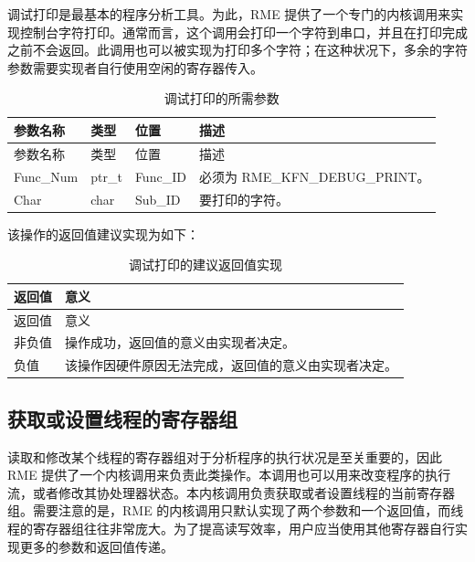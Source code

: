 调试打印是最基本的程序分析工具。为此，RME 提供了一个专门的内核调用来实现控制台字符打印。通常而言，这个调用会打印一个字符到串口，并且在打印完成之前不会返回。此调用也可以被实现为打印多个字符；在这种状况下，多余的字符参数需要实现者自行使用空闲的寄存器传入。

\begin{xltabular}{\textwidth}{@{}>{\hsize\raggedright\arraybackslash}X>{\hsize\raggedright\arraybackslash}X>{\hsize\raggedright\arraybackslash}X>{\hsize\raggedright\arraybackslash}X@{}}
\caption{调试打印的所需参数}\label{tab:8-109-debug-print-parameters}\\
\toprule
参数名称 & 类型 & 位置 & 描述\tabularnewline
\endfirsthead
\toprule
参数名称 & 类型 & 位置 & 描述\tabularnewline
\midrule
\endhead
\bottomrule
\endlastfoot
Func\_Num & ptr\_t & Func\_ID & 必须为 RME\_KFN\_DEBUG\_PRINT。\tabularnewline
Char & char & Sub\_ID & 要打印的字符。\tabularnewline
\end{xltabular}

该操作的返回值建议实现为如下：

\begin{xltabular}{\textwidth}{@{}>{\hsize\raggedright\arraybackslash}X>{\hsize\raggedright\arraybackslash}X@{}}
\caption{调试打印的建议返回值实现}\label{tab:8-110-debug-print-suggested-return-values}\\
\toprule
返回值 & 意义\tabularnewline
\endfirsthead
\toprule
返回值 & 意义\tabularnewline
\midrule
\endhead
\bottomrule
\endlastfoot
    非负值 & 操作成功，返回值的意义由实现者决定。\tabularnewline
    负值 & 该操作因硬件原因无法完成，返回值的意义由实现者决定。\tabularnewline
\end{xltabular}

\subsection{获取或设置线程的寄存器组}\label{subsec:8-get-or-set-thread-register-set}

读取和修改某个线程的寄存器组对于分析程序的执行状况是至关重要的，因此 RME 提供了一个内核调用来负责此类操作。本调用也可以用来改变程序的执行流，或者修改其协处理器状态。本内核调用负责获取或者设置线程的当前寄存器组。需要注意的是，RME 的内核调用只默认实现了两个参数和一个返回值，而线程的寄存器组往往非常庞大。为了提高读写效率，用户应当使用其他寄存器自行实现更多的参数和返回值传递。


